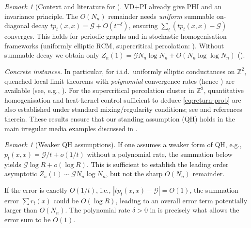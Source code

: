 \documentclass{article}
\numberwithin{equation}{section}
\theoremstyle{definition}
\theoremstyle{remark}
\newtheorem{remark}[theorem]{Remark}
\newcommand{\cG}{\mathcal{G}}
\begin{document}
\begin{remark}[Context and literature for ]\label{rem:QH_validity}
VD+PI already give PHI and an invariance principle. The $O(N_n)$ remainder needs \emph{uniform} summable on-diagonal decay $t p_t(x,x)=\cG+O(t^{-\delta})$, ensuring $\sum_t (t p_t(x,x)-\cG)$ converges. This holds for periodic graphs and in stochastic homogenisation frameworks (uniformly elliptic RCM, supercritical percolation: \cite{Biskup11,AndresDeuschelSlowik19,Barlow04,ArmstrongDario18,GloriaOtto17,CroydonHambly21}). Without summable decay we obtain only $Z_n(1)=\cG N_n\log N_n+O(N_n\log\log N_n)$ ().
\smallskip

\noindent\emph{Concrete instances.}
In particular, for i.i.d.\ uniformly elliptic conductances on $\mathbb{Z}^2$, quenched local limit theorems with \emph{polynomial} convergence rates (hence ) are available (see, e.g., \cite{AndresDeuschelSlowik19,GloriaOtto17,CroydonHambly21}). For the supercritical percolation cluster in $\mathbb{Z}^2$, quantitative homogenisation and heat-kernel control sufficient to deduce \eqref{eq:return-prob} are also established under standard mixing/regularity conditions; see \cite{Barlow04,ArmstrongDario18} and references therein. These results ensure that our standing assumption \textup{(QH)} holds in the main irregular media examples discussed in .
\end{remark}


\begin{remark}[Weaker QH assumptions]\label{rem:weaker_QH}
If one assumes a weaker form of QH, e.g., $p_t(x,x) = \cG/t + o(1/t)$ without a polynomial rate, the summation below yields $\cG \log R + o(\log R)$. This is sufficient to establish the leading order asymptotic $Z_n(1) \sim \cG N_n \log N_n$, but not the sharp $O(N_n)$ remainder.

If the error is exactly $O(1/t)$, i.e., $|t p_t(x,x) - \cG| = O(1)$, the summation error $\sum r_t(x)$ could be $O(\log R)$, leading to an overall error term potentially larger than $O(N_n)$. The polynomial rate $\delta>0$ in  is precisely what allows the error sum to be $O(1)$.
\end{remark}
\end{document}
